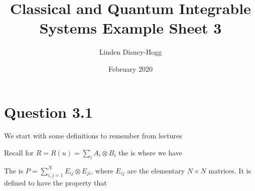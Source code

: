 \documentclass{article}
\title{Classical and Quantum Integrable Systems Example Sheet 3}
\author{Linden Disney-Hogg}
\date{February 2020}
\begin{document}
\maketitle
\tableofcontents

\section{Question 3.1}

We start with some definitions to remember from lectures

\begin{definition}
Recall for $R = R(u) = \sum_i A_i \otimes B_i$ the  is 
where we have 
\end{definition}

\begin{definition}
The  is $P = \sum_{i,j = 1}^N E_{ij} \otimes E_{ji}$, where $E_{ij}$ are the elementary $N \times N$ matrices. It is defined to have the property that 
\end{definition}
\end{document}
